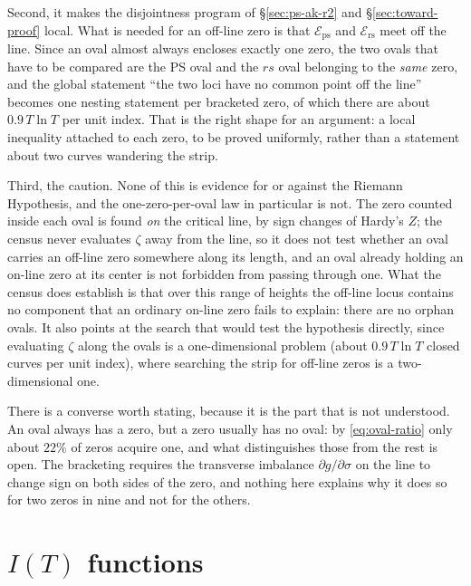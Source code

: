 \documentclass[11pt]{article}
\theoremstyle{definition}
\begin{document}
Second, it makes the disjointness program of \S\ref{sec:ps-ak-r2} and
\S\ref{sec:toward-proof} local. What is needed for an off-line zero is that
$\mathcal{E}_{\mathrm{ps}}$ and $\mathcal{E}_{\mathrm{rs}}$ meet off the line.
Since an oval almost always encloses exactly one zero, the two ovals that have to be
compared are the PS oval and the $rs$ oval belonging to the \emph{same} zero,
and the global statement ``the two loci have no common point off the line''
becomes one nesting statement per bracketed zero, of which there are about
$0.9\,T\ln T$ per unit index. That is the right shape for an argument: a local
inequality attached to each zero, to be proved uniformly, rather than a
statement about two curves wandering the strip.

Third, the caution. None of this is evidence for or against the Riemann
Hypothesis, and the one-zero-per-oval law in particular is not. The zero counted
inside each oval is found \emph{on} the critical line, by sign changes of
Hardy's $Z$; the census never evaluates $\zeta$ away from the line, so it does
not test whether an oval carries an off-line zero somewhere along its length,
and an oval already holding an on-line zero at its center is not forbidden from
passing through one. What the census does establish is that over this range of
heights the off-line locus contains no component that an ordinary on-line zero
fails to explain: there are no orphan ovals. It also points at the search that
would test the hypothesis directly, since evaluating $\zeta$ along the ovals is
a one-dimensional problem (about $0.9\,T\ln T$ closed curves per unit index),
where searching the strip for off-line zeros is a two-dimensional one.

There is a converse worth stating, because it is the part that is not
understood. An oval always has a zero, but a zero usually has no oval: by
\eqref{eq:oval-ratio} only about $22\%$ of zeros acquire one, and what
distinguishes those from the rest is open. The bracketing requires the
transverse imbalance $\partial g/\partial\sigma$ on the line to change sign on
both sides of the zero, and nothing here explains why it does so for two zeros
in nine and not for the others.

\clearpage
\section{\texorpdfstring{$I(T)$}{I(T)} functions}\label{sec:IT-functions}
\end{document}
